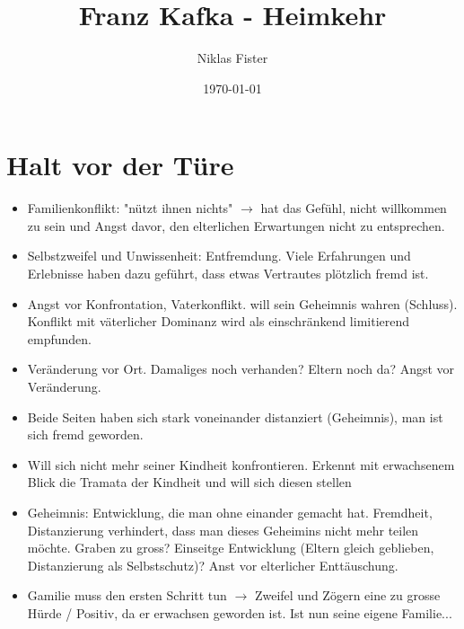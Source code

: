\documentclass{article}
\title{\Huge\textbf{Franz Kafka - Heimkehr}}
\author{Niklas Fister}
\date{\today}
\begin{document}
\maketitle
\newpage

\section{Halt vor der Türe}
\begin{itemize}[parsep=0pt]
    \item Familienkonflikt: "nützt ihnen nichts" $\rightarrow$ hat das Gefühl, nicht willkommen zu sein und Angst davor, den elterlichen Erwartungen nicht zu entsprechen.
    \item Selbstzweifel und Unwissenheit: Entfremdung. Viele Erfahrungen und Erlebnisse haben dazu geführt, dass etwas Vertrautes plötzlich fremd ist.
    \item Angst vor Konfrontation, Vaterkonflikt. will sein Geheimnis wahren (Schluss). Konflikt mit väterlicher Dominanz wird als einschränkend limitierend empfunden.
    \item Veränderung vor Ort. Damaliges noch verhanden? Eltern noch da? Angst vor Veränderung.
    \item Beide Seiten haben sich stark voneinander distanziert (Geheimnis), man ist sich fremd geworden.
    \item Will sich nicht mehr seiner Kindheit konfrontieren. Erkennt mit erwachsenem Blick die Tramata der Kindheit und will sich diesen stellen
    \item Geheimnis: Entwicklung, die man ohne einander gemacht hat. Fremdheit, Distanzierung verhindert, dass man dieses Geheimins nicht mehr teilen möchte. Graben zu gross? Einseitge Entwicklung (Eltern gleich geblieben, Distanzierung als Selbstschutz)? Anst vor elterlicher Enttäuschung.
    \item Gamilie muss den ersten Schritt tun $\rightarrow$ Zweifel und Zögern eine zu grosse Hürde / Positiv, da er erwachsen geworden ist. Ist nun seine eigene Familie...
\end{itemize}

\newpage
\end{document}
